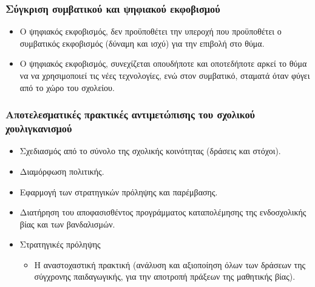 \documentclass[hyperref={pdfpagelabels=false}, t]{beamer}
\let\olditem=\item%
\renewcommand{\item}{\olditem \justifying}%
\begin{document}
\begin{frame}[t]
\frametitle{Σύγκριση συμβατικού και ψηφιακού εκφοβισμού}
\vspace{-18.5pt}
\begin{adjustwidth}{-0.7cm}{}
\justifying
\begin{itemize}
  \item Ο ψηφιακός εκφοβισμός, δεν προϋποθέτει την υπεροχή που προϋποθέτει ο
  συμβατικός εκφοβισμός (δύναμη και ισχύ) για την επιβολή στο θύμα.
  \setlength{\itemsep}{15pt}
  \item Ο ψηφιακός εκφοβισμός, συνεχίζεται οπουδήποτε και οποτεδήποτε αρκεί το
  θύμα να να χρησιμοποιεί τις νέες τεχνολογίες, ενώ στον συμβατικό, σταματά όταν φύγει από
  το χώρο του σχολείου. \setlength{\itemsep}{15pt}
 \setlength{\itemsep}{15pt}
\end{itemize}

\end{adjustwidth}
\end{frame}

%
%

\begin{frame}[t]
\frametitle{Αποτελεσματικές πρακτικές αντιμετώπισης του σχολικού
χουλιγκανισμού}
\vspace{-18.5pt}
\begin{adjustwidth}{-0.7cm}{}
\justifying
\begin{itemize}
  \item Σχεδιασμός από το σύνολο της σχολικής κοινότητας (δράσεις και στόχοι). 
\setlength{\itemsep}{15pt} 
 \item Διαμόρφωση πολιτικής. \setlength{\itemsep}{15pt}
 \item Εφαρμογή των στρατηγικών πρόληψης και παρέμβασης.
 \setlength{\itemsep}{15pt} 
 \item Διατήρηση του αποφασισθέντος προγράμματος  καταπολέμησης της ενδοσχολικής
 βίας και των βανδαλισμών. \setlength{\itemsep}{15pt} 
 \item Στρατηγικές πρόληψης \setlength{\itemsep}{15pt} 
\begin{itemize}
  \item H αναστοχαστική πρακτική (ανάλυση και αξιοποίηση όλων των δράσεων της
  σύγχρονης παιδαγωγικής, για την αποτροπή πράξεων της μαθητικής βίας).

\end{itemize}

\end{itemize}

\end{adjustwidth}
\end{frame}
\end{document}

